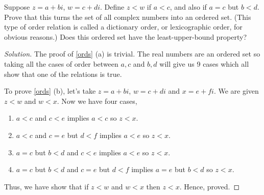 \begin{prblm}
    Suppose $z = a + bi$, $w = c + di$. Define $z < w$ if $a < c$, and also if $a = c$ but $b < d$. 
    Prove that this turns the set of all complex numbers into an ordered set. 
    (This type of order relation is called a dictionary order, or lexicographic order, for obvious reasons.) 
    Does this ordered set have the least-upper-bound property?

    \begin{proof}[Solution]
        The proof of \ref{ords} (a) is trivial. The real numbers are an ordered set so taking all the cases of 
        order between $a, c$ and $b, d$ will give us 9 cases which all show that one of the relations is true.

        To prove \ref{ords} (b), let's take $z = a + bi$, $w = c + di$ and $x = e + fi$.
        We are given $z < w$ and $w < x$. Now we have four cases,
        \begin{enumerate}
            \item $a < c$ and $c < e$ implies $a < c$ so $z < x$.
            \item $a < c$ and $c = e$ but $d < f$ implies $a < e$ so $z < x$.
            \item $a = c$ but $b < d$ and $c < e$ implies $a < e$ so $z < x$.
            \item $a = c$ but $b < d$ and $c = e$ but $d < f$ implies $a = e$ but $b < d$ so $z < x$.
        \end{enumerate}
        Thus, we have show that if $z < w$ and $w < x$ then $z < x$. 
        Hence, proved. 
    \end{proof}
\end{prblm}

